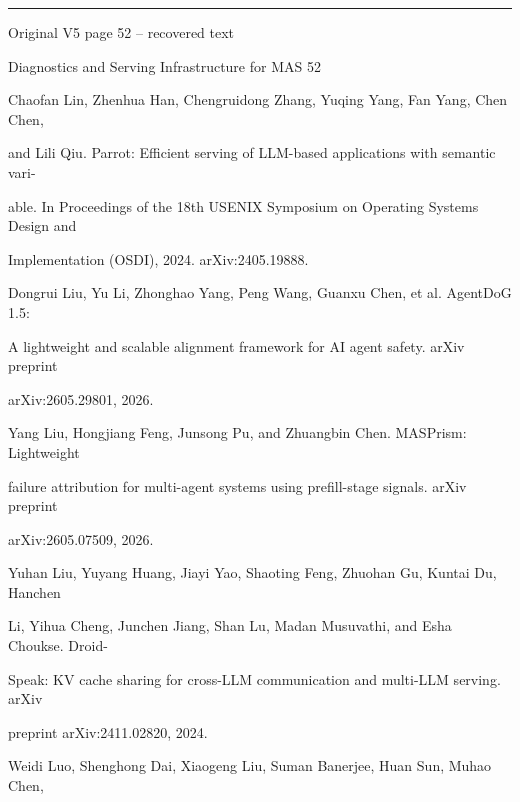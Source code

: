 \par\smallskip\noindent\rule{\textwidth}{0.4pt}\par{\sffamily\footnotesize Original V5 page 52 -- recovered text}\par\begin{flushleft}\footnotesize\ttfamily
\par\smallskip
\par\smallskip
\noindent Diagnostics and Serving Infrastructure for MAS 52\par
\par\smallskip
\par\smallskip
\par\smallskip
\noindent [17] Chaofan Lin, Zhenhua Han, Chengruidong Zhang, Yuqing Yang, Fan Yang, Chen Chen,\par
\noindent  and Lili Qiu. Parrot: Efficient serving of LLM-based applications with semantic vari-\par
\noindent  able. In Proceedings of the 18th USENIX Symposium on Operating Systems Design and\par
\noindent  Implementation (OSDI), 2024. arXiv:2405.19888.\par
\noindent [18] Dongrui Liu, Yu Li, Zhonghao Yang, Peng Wang, Guanxu Chen, et al. AgentDoG 1.5:\par
\noindent  A lightweight and scalable alignment framework for AI agent safety. arXiv preprint\par
\noindent  arXiv:2605.29801, 2026.\par
\noindent [19] Yang Liu, Hongjiang Feng, Junsong Pu, and Zhuangbin Chen. MASPrism: Lightweight\par
\noindent  failure attribution for multi-agent systems using prefill-stage signals. arXiv preprint\par
\noindent  arXiv:2605.07509, 2026.\par
\noindent [20] Yuhan Liu, Yuyang Huang, Jiayi Yao, Shaoting Feng, Zhuohan Gu, Kuntai Du, Hanchen\par
\noindent  Li, Yihua Cheng, Junchen Jiang, Shan Lu, Madan Musuvathi, and Esha Choukse. Droid-\par
\noindent  Speak: KV cache sharing for cross-LLM communication and multi-LLM serving. arXiv\par
\noindent  preprint arXiv:2411.02820, 2024.\par
\noindent [21] Weidi Luo, Shenghong Dai, Xiaogeng Liu, Suman Banerjee, Huan Sun, Muhao Chen,\par

\end{flushleft}
